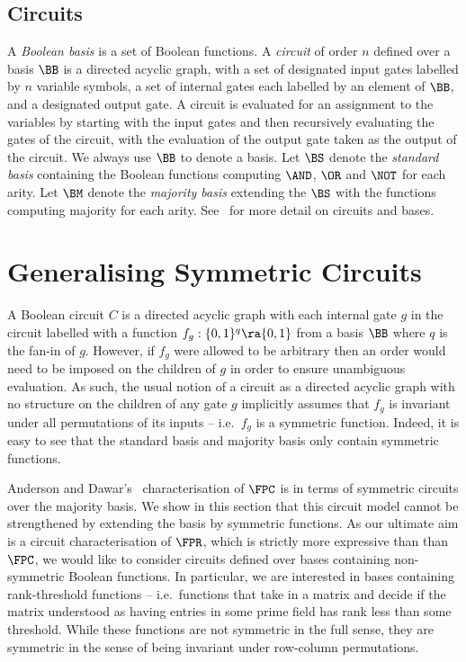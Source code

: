 \documentclass[a4paper,UKenglish]{lipics-v2018}
\begin{document}
\subsection{Circuits}
A \emph{Boolean basis} is a set of Boolean functions. A \emph{circuit} of order
$n$ defined over a basis $\BB$ is a directed acyclic graph, with a set of
designated input gates labelled by $n$ variable symbols, a set of internal gates
each labelled by an element of $\BB$, and a designated output gate. A circuit is
evaluated for an assignment to the variables by starting with the input gates
and then recursively evaluating the gates of the circuit, with the evaluation of
the output gate taken as the output of the circuit. We always use $\BB$ to
denote a basis. Let $\BS$ denote the \emph{standard basis} containing the
Boolean functions computing $\AND$, $\OR$ and $\NOT$ for each arity. Let $\BM$
denote the \emph{majority basis} extending the $\BS$ with the functions
computing majority for each arity. See~\cite{Arora:2009, AndersonD17} for more
detail on circuits and bases.

\section{Generalising Symmetric Circuits}
A Boolean circuit $C$ is a directed acyclic graph with each internal gate $g$ in
the circuit labelled with a function $f_g : \{0,1\}^q \ra \{0,1\}$ from a basis
$\BB$ where $q$ is the fan-in of $g$. However, if $f_g$ were allowed to be
arbitrary then an order would need to be imposed on the children of $g$ in order
to ensure unambiguous evaluation. As such, the usual notion of a circuit as a
directed acyclic graph with no structure on the children of any gate $g$
implicitly assumes that $f_g$ is invariant under all permutations of its inputs
-- i.e.\ $f_g$ is a symmetric function. Indeed, it is easy to see that the
standard basis and majority basis only contain symmetric functions.

Anderson and Dawar's~\cite{AndersonD17} characterisation of $\FPC$ is in terms
of symmetric circuits over the majority basis. We show in this section that this
circuit model cannot be strengthened by extending the basis by symmetric
functions. As our ultimate aim is a circuit characterisation of $\FPR$, which is
strictly more expressive than than $\FPC$, we would like to consider circuits
defined over bases containing non-symmetric Boolean functions. In particular, we
are interested in bases containing rank-threshold functions -- i.e.\ functions
that take in a matrix and decide if the matrix understood as having entries in
some prime field has rank less than some threshold. While these functions are
not symmetric in the full sense, they are symmetric in the sense of being
invariant under row-column permutations.
\end{document}
